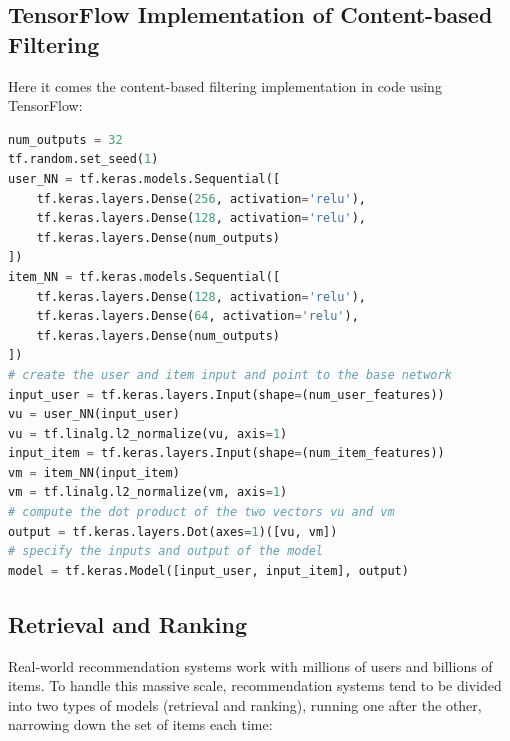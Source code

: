 \documentclass[a4paper, 12pt]{book}
\begin{document}
\subsection{TensorFlow Implementation of Content-based Filtering}

Here it comes the content-based filtering implementation in code using TensorFlow:

\begin{lstlisting}[language=Python]
num_outputs = 32
tf.random.set_seed(1)
user_NN = tf.keras.models.Sequential([
    tf.keras.layers.Dense(256, activation='relu'),
    tf.keras.layers.Dense(128, activation='relu'),
    tf.keras.layers.Dense(num_outputs)
])
item_NN = tf.keras.models.Sequential([   
    tf.keras.layers.Dense(128, activation='relu'),
    tf.keras.layers.Dense(64, activation='relu'),
    tf.keras.layers.Dense(num_outputs)
])
# create the user and item input and point to the base network
input_user = tf.keras.layers.Input(shape=(num_user_features))
vu = user_NN(input_user)
vu = tf.linalg.l2_normalize(vu, axis=1)
input_item = tf.keras.layers.Input(shape=(num_item_features))
vm = item_NN(input_item)
vm = tf.linalg.l2_normalize(vm, axis=1)
# compute the dot product of the two vectors vu and vm
output = tf.keras.layers.Dot(axes=1)([vu, vm])
# specify the inputs and output of the model
model = tf.keras.Model([input_user, input_item], output)
\end{lstlisting}

\subsection{Retrieval and Ranking}
Real-world recommendation systems work with millions of users and billions of items. To handle this massive scale, recommendation systems tend to be divided into two types of models (retrieval and ranking), running one after the other, narrowing down the set of items each time:
\end{document}
